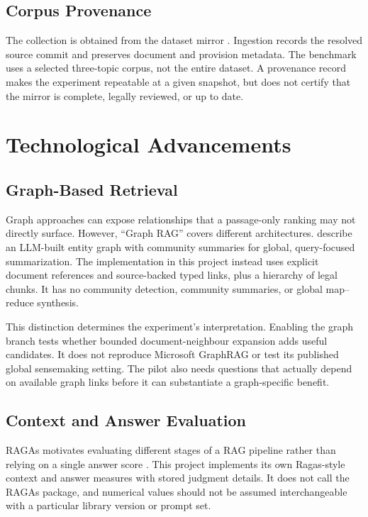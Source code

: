 \subsection{Corpus Provenance}
The collection is obtained from the  dataset mirror \citep{phapdien}. Ingestion records the resolved source commit and preserves document and provision metadata. The benchmark uses a selected three-topic corpus, not the entire dataset. A provenance record makes the experiment repeatable at a given snapshot, but does not certify that the mirror is complete, legally reviewed, or up to date.

\section{Technological Advancements}
\subsection{Graph-Based Retrieval}
Graph approaches can expose relationships that a passage-only ranking may not directly surface. However, ``Graph RAG'' covers different architectures. \citet{edge2024graph} describe an LLM-built entity graph with community summaries for global, query-focused summarization. The implementation in this project instead uses explicit document references and source-backed typed links, plus a hierarchy of legal chunks. It has no community detection, community summaries, or global map--reduce synthesis.

This distinction determines the experiment's interpretation. Enabling the graph branch tests whether bounded document-neighbour expansion adds useful candidates. It does not reproduce Microsoft GraphRAG or test its published global sensemaking setting. The pilot also needs questions that actually depend on available graph links before it can substantiate a graph-specific benefit.

\subsection{Context and Answer Evaluation}
RAGAs motivates evaluating different stages of a RAG pipeline rather than relying on a single answer score \citep{es2024ragas}. This project implements its own Ragas-style context and answer measures with stored judgment details. It does not call the RAGAs package, and numerical values should not be assumed interchangeable with a particular library version or prompt set.

